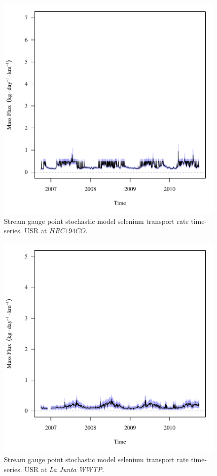 \begin{figure}[htbp]
	\begin{center}
	\includegraphics[width=6in]{"Figures/Results_USR/f HRC"}
	\caption{Stream gauge point stochastic model selenium transport rate time-series.  USR at $HRC194CO$.}
	\end{center}
\end{figure}
\newpage

\begin{figure}[htbp]
	\begin{center}
	\includegraphics[width=6in]{"Figures/Results_USR/f WTP"}
	\caption{Stream gauge point stochastic model selenium transport rate time-series.  USR at \textit{La Junta WWTP}.}
	\end{center}
\end{figure}
\newpage

